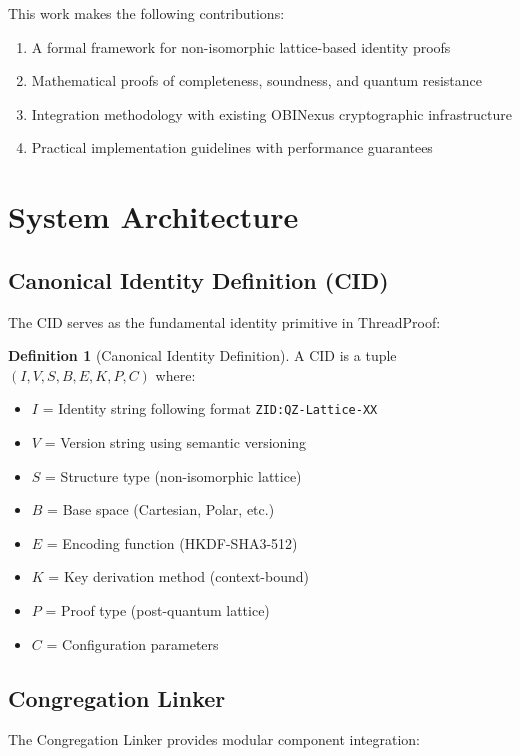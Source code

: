 \documentclass[11pt]{article}
\theoremstyle{definition}
\newtheorem{definition}{Definition}[section]
\begin{document}
This work makes the following contributions:
\begin{enumerate}
  \item A formal framework for non-isomorphic lattice-based identity proofs
  \item Mathematical proofs of completeness, soundness, and quantum resistance
  \item Integration methodology with existing OBINexus cryptographic infrastructure
  \item Practical implementation guidelines with performance guarantees
\end{enumerate}

\section{System Architecture}

\subsection{Canonical Identity Definition (CID)}

The CID serves as the fundamental identity primitive in ThreadProof:

\begin{definition}[Canonical Identity Definition]
A CID is a tuple $(I, V, S, B, E, K, P, C)$ where:
\begin{itemize}
  \item $I$ = Identity string following format \texttt{ZID:QZ-Lattice-XX}
  \item $V$ = Version string using semantic versioning
  \item $S$ = Structure type (non-isomorphic lattice)
  \item $B$ = Base space (Cartesian, Polar, etc.)
  \item $E$ = Encoding function (HKDF-SHA3-512)
  \item $K$ = Key derivation method (context-bound)
  \item $P$ = Proof type (post-quantum lattice)
  \item $C$ = Configuration parameters
\end{itemize}
\end{definition}

\subsection{Congregation Linker}

The Congregation Linker provides modular component integration:
\end{document}
